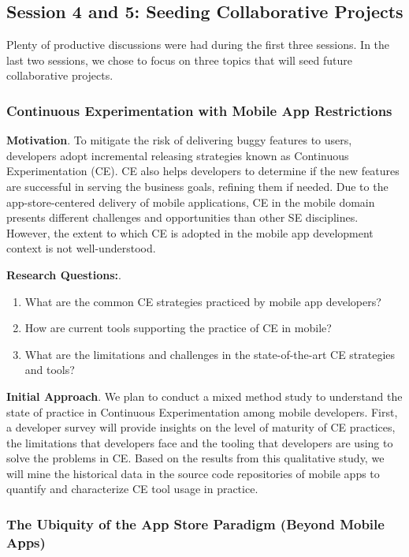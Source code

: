 \documentclass[a4paper]{article}
\newcommand{\smallsection}[1]{\noindent \textbf{#1}. }
\begin{document}
\subsection{Session 4 and 5: Seeding Collaborative Projects}

Plenty of productive discussions were had during the first three sessions. In the last two sessions, we chose to focus on three topics that will seed future collaborative projects.

\subsubsection{Continuous Experimentation with Mobile App Restrictions}

\smallsection{Motivation}
To mitigate the risk of delivering buggy features to users, developers adopt incremental releasing strategies known as Continuous Experimentation (CE). CE also helps developers to determine if the new features are successful in serving the business goals, refining them if needed. Due to the app-store-centered delivery of mobile applications, CE in the mobile domain presents different challenges and opportunities than other SE disciplines. However, the extent to which CE is adopted in the mobile app development context is not well-understood.

\smallsection{Research Questions:}

\begin{enumerate}[\bfseries RQ1]
	\item What are the common CE strategies practiced by mobile app developers?
	\item How are current tools supporting the practice of CE in mobile?
	\item What are the limitations and challenges in the state-of-the-art CE strategies and tools?
\end{enumerate}

\smallsection{Initial Approach}
We plan to conduct a mixed method study to understand the state of practice in Continuous Experimentation among mobile developers. First, a developer survey will provide insights on the level of maturity of CE practices, the limitations that developers face and the tooling that developers are using to solve the problems in CE. Based on the results from this qualitative study, we will mine the historical data in the source code repositories of mobile apps to quantify and characterize CE tool usage in practice.

\subsubsection{The Ubiquity of the App Store Paradigm (Beyond Mobile Apps)}
\end{document}
